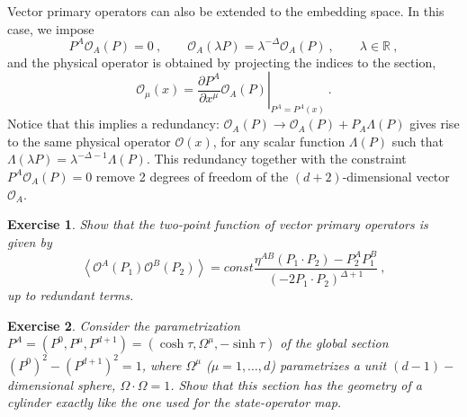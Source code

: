 \documentclass{ws-rv9x6}
\newtheorem{exercise}{Exercise}[section]
\newcommand\be{\begin{equation}}
\newcommand\ee{\end{equation}}
\begin{document}
Vector primary operators can also be extended to the embedding space.
In this case, we impose
\be
P^{A}\mathcal{O}_{A}(P)=0\ ,\qquad\mathcal{O}_{A}(\lambda P)=\lambda^{-\Delta}\mathcal{O}_{A}(P)\ ,\qquad\lambda\in\mathbb{R}\ ,
\ee
and the physical operator is obtained by projecting the indices to
the section,
\be
\mathcal{O}_{\mu}(x)=\left.\frac{\partial P^{A}}{\partial x^{\mu}}\mathcal{O}_{A}(P)\right|_{P^{A}=P^{A}(x)}\ .
\ee
Notice that this implies a redundancy: $\mathcal{O}_{A}(P)\to\mathcal{O}_{A}(P)+P_{A}\Lambda(P)$
gives rise to the same physical operator $\mathcal{O}(x)$, for any
scalar function $\Lambda(P)$ such that $\Lambda(\lambda P)=\lambda^{-\Delta-1}\Lambda(P)$.
This redundancy together with the constraint $P^{A}\mathcal{O}_{A}(P)=0$
remove 2 degrees of freedom of the $(d+2)$-dimensional vector $\mathcal{O}_{A}$.
\begin{exercise} Show that the two-point function of vector primary
operators is given by 
\be
\left\langle \mathcal{O}^{A}(P_{1})\mathcal{O}^{B}(P_{2})\right\rangle =const\frac{\eta^{AB}\left(P_{1}\cdot P_{2}\right)-P_{2}^{A}P_{1}^{B}}{\left(-2P_{1}\cdot P_{2}\right)^{\Delta+1}}\ ,
\ee
up to redundant terms.
\end{exercise}
\begin{exercise} 
 Consider the parametrization $P^{A}=\left(P^{0},P^{\mu},P^{d+1}\right)=\left(\cosh\tau,\Omega^{\mu},-\sinh\tau\right)$
of the global section $\left(P^{0}\right)^{2}-\left(P^{d+1}\right)^{2}=1$,
where $\Omega^{\mu}$ ($\mu=1,\dots,d$) parametrizes a unit $(d-1)-$dimensional
sphere, $\Omega\cdot\Omega=1$. Show that this section has the geometry
of a cylinder exactly like the one used for the state-operator map. 
\end{exercise}
\end{document}
